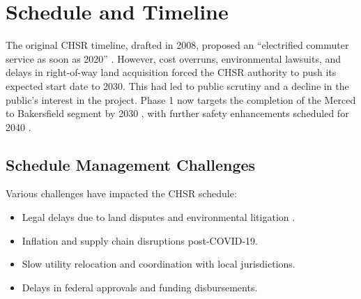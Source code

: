 \chapter{Schedule and Timeline}

The original CHSR timeline, drafted in 2008, proposed an “electrified commuter service as soon as 2020” \citep{ureport2015}. However, cost overruns, environmental lawsuits, and delays in right-of-way land acquisition forced the CHSR authority to push its expected start date to 2030. This had led to public scrutiny and a decline in the public’s interest in the project. Phase 1 now targets the completion of the Merced to Bakersfield segment by 2030 \citep{ureport2023}, with further safety enhancements scheduled for 2040 \citep{ureport2025}.

\section{Schedule Management Challenges}
Various challenges have impacted the CHSR schedule:
\begin{itemize}
	\item Legal delays due to land disputes and environmental litigation \citep{pur2025}.
	\item Inflation and supply chain disruptions post-COVID-19.
	\item Slow utility relocation and coordination with local jurisdictions.
	\item Delays in federal approvals and funding disbursements.
\end{itemize}

